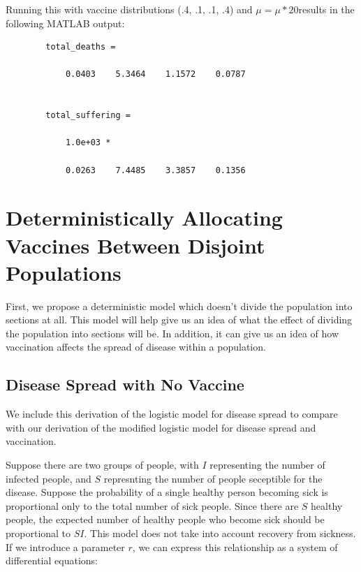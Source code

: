 \documentclass[titlepage]{article}
\begin{document}
    Running this with vaccine distributions (.4, .1, .1, .4) and $\mu = \mu * 20$results in the following MATLAB output:

    \begin{lstlisting}
        total_deaths =

            0.0403    5.3464    1.1572    0.0787


        total_suffering =

            1.0e+03 *

            0.0263    7.4485    3.3857    0.1356
    \end{lstlisting}

\section{Deterministically Allocating Vaccines Between Disjoint Populations}

First, we propose a deterministic model which doesn't divide the population
	into sections at all.
This model will help give us an idea of what the effect of dividing
	the population into sections will be.
In addition, it can give us an idea of how vaccination affects the spread of
	disease within a population.

\subsection{Disease Spread with No Vaccine}

We include this derivation of the logistic model for disease spread
	to compare with our derivation of the modified logistic model
	for disease spread and vaccination.

Suppose there are two groups of people, with $I$ representing the number of
	infected people, and $S$ represnting the number of people seceptible for the
	disease.
Suppose the probability of a single healthy person becoming sick is proportional
	only to the total number of sick people.
Since there are $S$ healthy people, the expected number of healthy people
	who become sick should be proportional to $S I$.
This model does not take into account recovery from sickness.
If we introduce a parameter $r$, we can express this relationship as a system
	of differential equations:
\end{document}
